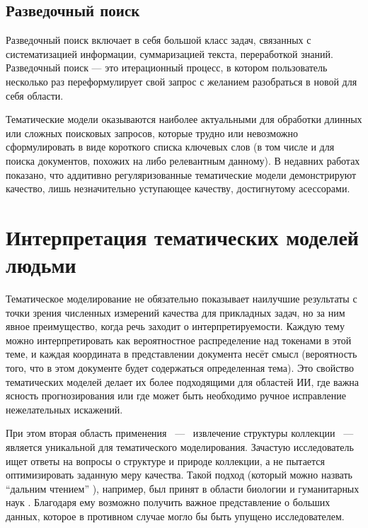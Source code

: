 \subsection{Разведочный поиск}

Разведочный поиск включает в себя большой класс задач, связанных с систематизацией информации, суммаризацией текста, переработкой знаний. Разведочный поиск --- это итерационный процесс, в котором пользователь несколько раз переформулирует свой запрос с желанием разобраться в новой для себя области. 

Тематические модели оказываются наиболее актуальными для обработки длинных или сложных поисковых запросов, которые трудно  или невозможно сформулировать в виде короткого списка ключевых слов (в том числе и для поиска документов, похожих на либо релевантным данному). В недавних работах \cite{ianina2017multi, ianina2019regularized} показано, что аддитивно регуляризованные тематические модели демонстрируют качество, лишь незначительно уступающее качеству, достигнутому асессорами.

\section{Интерпретация тематических моделей людьми}

Тематическое моделирование не обязательно показывает наилучшие результаты с точки зрения численных измерений качества для прикладных задач, но за ним явное преимущество, когда речь заходит о интерпретируемости. Каждую тему можно интерпретировать как вероятностное распределение над токенами в этой теме, и каждая координата в представлении документа несёт смысл (вероятность того, что в этом документе будет содержаться определенная тема). Это свойство тематических моделей делает их более подходящими для областей ИИ, где важна ясность прогнозирования или где может быть необходимо ручное исправление нежелательных искажений.

При этом вторая область применения ~---~ извлечение структуры коллекции ~---~ является уникальной для тематического моделирования. Зачастую исследователь ищет ответы на вопросы о структуре и природе коллекции, а не пытается оптимизировать заданную меру качества. Такой подход (который можно назвать ``дальним чтением'' \cite{milkova2019distant}), например, был принят в области биологии \cite{Liu2016,funnell2019integrated} и гуманитарных наук \cite{fntir2017applications,antons2019content}. Благодаря ему возможно получить важное представление о больших данных, которое в противном случае могло бы быть упущено исследователем.

